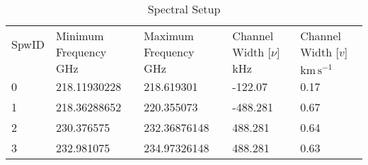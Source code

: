 \begin{table*}[htp]
\caption{Spectral Setup}
\begin{tabular}{lllll}
\label{tab:spw}
SpwID & Minimum Frequency & Maximum Frequency & Channel Width [$\nu$] & Channel Width [$v$] \\
 & $\mathrm{GHz}$ & $\mathrm{GHz}$ & $\mathrm{kHz}$ & $\mathrm{km\,s^{-1}}$ \\
\hline
0 & 218.11930228 & 218.619301 & -122.07 & 0.17 \\
1 & 218.36288652 & 220.355073 & -488.281 & 0.67 \\
2 & 230.376575 & 232.36876148 & 488.281 & 0.64 \\
3 & 232.981075 & 234.97326148 & 488.281 & 0.63 \\
\hline
\end{tabular}
\end{table*}
